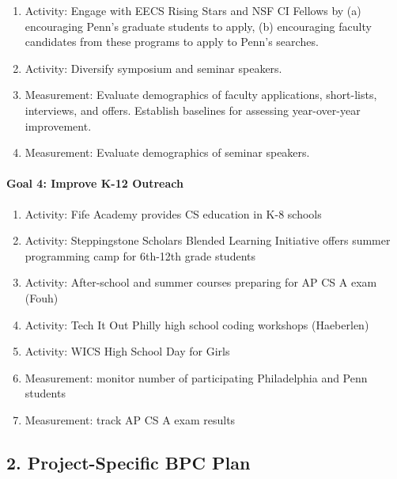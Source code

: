 \begin{enumerate}
\item Activity: Engage with EECS Rising Stars and NSF CI Fellows by (a) encouraging Penn’s graduate students to apply, (b) encouraging faculty candidates from these programs to apply to Penn's searches.
\item Activity: Diversify symposium and seminar speakers.
\item Measurement: Evaluate demographics of faculty applications, short-lists, interviews, and offers. Establish baselines for assessing year-over-year improvement.
\item Measurement: Evaluate demographics of seminar speakers.
\end{enumerate}

\paragraph*{Goal 4: Improve K-12 Outreach}

\begin{enumerate}
\item Activity: Fife Academy provides CS education in K-8 schools
\item Activity: Steppingstone Scholars Blended Learning Initiative offers summer programming camp for 6th-12th grade students
\item Activity: After-school and summer courses preparing for AP CS A exam (Fouh)
\item Activity: Tech It Out Philly high school coding workshops (Haeberlen)
\item Activity: WICS High School Day for Girls
\item Measurement: monitor number of participating Philadelphia and Penn students
\item Measurement: track AP CS A exam results
\end{enumerate}

\subsection*{2. Project-Specific BPC Plan}

